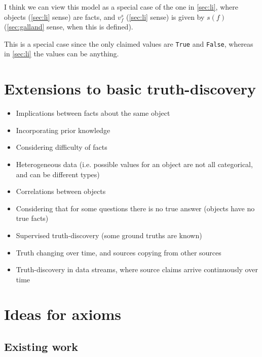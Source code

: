 \documentclass{article}
\theoremstyle{definition} \newtheorem{definition}{Definition}
\theoremstyle{definition} \newtheorem{example}{Example}
\theoremstyle{plain} \newtheorem{axiom}{Axiom}
\theoremstyle{plain} \newtheorem*{remark}{Remark}
\theoremstyle{remark} \newtheorem*{notation}{Notation}
\theoremstyle{plain} \newtheorem{lemma}{Lemma}
\theoremstyle{plain} \newtheorem{theorem}{Theorem}
\theoremstyle{plain} \newtheorem{proposition}{Proposition}
\begin{document}
I think we can view this model as a special case of the one in \ref{sec:li},
where objects (\ref{sec:li} sense) are facts, and $v_f^s$ (\ref{sec:li} sense)
is given by $s(f)$ (\ref{sec:galland} sense, when this is defined).

This is a special case since the only claimed values are \texttt{True} and
\texttt{False}, whereas in \ref{sec:li} the values can be anything.

\section{Extensions to basic truth-discovery}
\begin{itemize}

\item Implications between facts about the same object{\cite{yin_han_yu}}
\item Incorporating prior knowledge{\cite{pasternack}}
\item Considering difficulty of facts{\cite{galland}}
\item Heterogeneous data (i.e. possible values for an object are not all
categorical, and can be different types){\cite{li_conflicts}}
\item Correlations between objects{\cite{yang}}
\item Considering that for some questions there is no true answer (objects have
no true facts){\cite{zhi}}
\item Supervised truth-discovery (some ground truths are
known){\cite{yin_supervised}}
\item Truth changing over time, and sources copying from other
sources{\cite{dong}}
\item Truth-discovery in data streams, where source claims arrive continuously
over time{\cite{zhao}}

\end{itemize}

\section{Ideas for axioms}

\subsection{Existing work}
\end{document}
